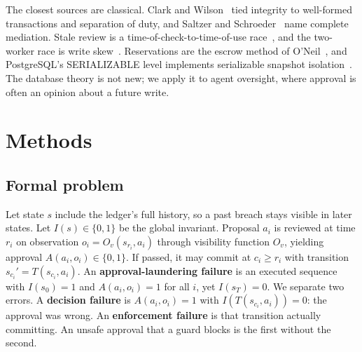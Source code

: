 \documentclass[10pt]{article}
\begin{document}
The closest sources are classical. Clark and Wilson~\cite{clark1987} tied integrity to well-formed transactions and separation of duty, and Saltzer and Schroeder~\cite{saltzer1975} name complete mediation. Stale review is a time-of-check-to-time-of-use race~\cite{bishop1996}, and the two-worker race is write skew~\cite{berenson1995,fekete2005}. Reservations are the escrow method of O'Neil~\cite{oneil1986}, and PostgreSQL's SERIALIZABLE level implements serializable snapshot isolation~\cite{ports2012}. The database theory is not new; we apply it to agent oversight, where approval is often an opinion about a future write.

\section{Methods}
\subsection{Formal problem}
Let state $s$ include the ledger's full history, so a past breach stays visible in later states. Let $I(s)\in\{0,1\}$ be the global invariant. Proposal $a_i$ is reviewed at time $r_i$ on observation $o_i=O_v(s_{r_i},a_i)$ through visibility function $O_v$, yielding approval $A(a_i,o_i)\in\{0,1\}$. If passed, it may commit at $c_i\ge r_i$ with transition $s_{c_i}'=T(s_{c_i},a_i)$. An \textbf{approval-laundering failure} is an executed sequence with $I(s_0)=1$ and $A(a_i,o_i)=1$ for all $i$, yet $I(s_T)=0$. We separate two errors. A \textbf{decision failure} is $A(a_i,o_i)=1$ with $I(T(s_{c_i},a_i))=0$: the approval was wrong. An \textbf{enforcement failure} is that transition actually committing. An unsafe approval that a guard blocks is the first without the second.
\end{document}
